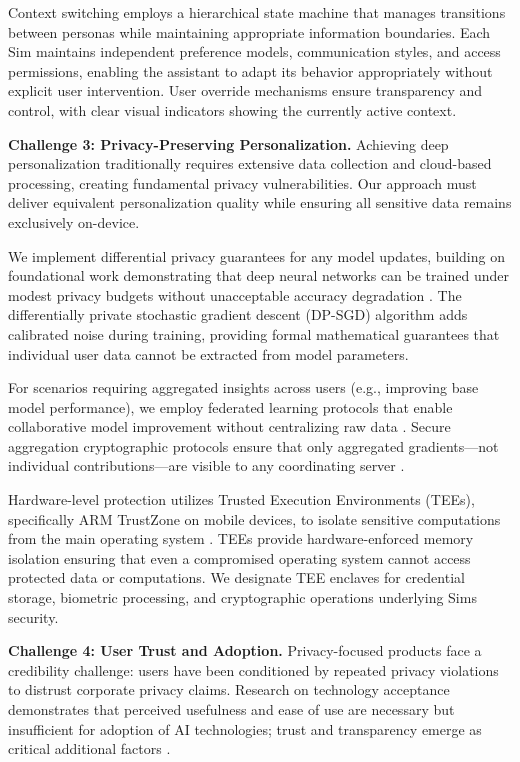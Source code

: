 \documentclass[11pt]{article}
\begin{document}
Context switching employs a hierarchical state machine that manages transitions between personas while maintaining appropriate information boundaries. Each Sim maintains independent preference models, communication styles, and access permissions, enabling the assistant to adapt its behavior appropriately without explicit user intervention. User override mechanisms ensure transparency and control, with clear visual indicators showing the currently active context.

\textbf{Challenge 3: Privacy-Preserving Personalization.}
Achieving deep personalization traditionally requires extensive data collection and cloud-based processing, creating fundamental privacy vulnerabilities. Our approach must deliver equivalent personalization quality while ensuring all sensitive data remains exclusively on-device.

We implement differential privacy guarantees for any model updates, building on foundational work demonstrating that deep neural networks can be trained under modest privacy budgets without unacceptable accuracy degradation \cite{abadi2016deep}. The differentially private stochastic gradient descent (DP-SGD) algorithm adds calibrated noise during training, providing formal mathematical guarantees that individual user data cannot be extracted from model parameters.

For scenarios requiring aggregated insights across users (e.g., improving base model performance), we employ federated learning protocols that enable collaborative model improvement without centralizing raw data \cite{mcmahan2017communication}. Secure aggregation cryptographic protocols ensure that only aggregated gradients---not individual contributions---are visible to any coordinating server \cite{bonawitz2017practical}.

Hardware-level protection utilizes Trusted Execution Environments (TEEs), specifically ARM TrustZone on mobile devices, to isolate sensitive computations from the main operating system \cite{pinto2019demystifying}. TEEs provide hardware-enforced memory isolation ensuring that even a compromised operating system cannot access protected data or computations. We designate TEE enclaves for credential storage, biometric processing, and cryptographic operations underlying Sims security.

\textbf{Challenge 4: User Trust and Adoption.}
Privacy-focused products face a credibility challenge: users have been conditioned by repeated privacy violations to distrust corporate privacy claims. Research on technology acceptance demonstrates that perceived usefulness and ease of use are necessary but insufficient for adoption of AI technologies; trust and transparency emerge as critical additional factors \cite{davis1989perceived, sohn2020technology}.
\end{document}
